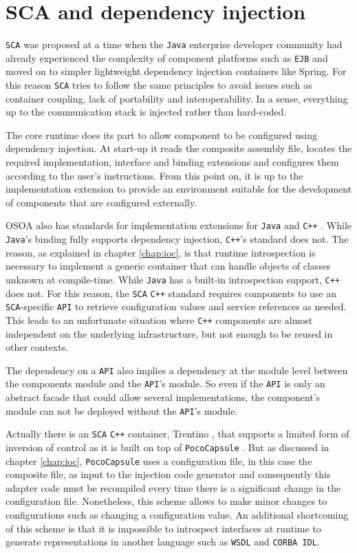\section{SCA and dependency injection}

\texttt{SCA} was proposed at a time when the \texttt{Java} enterprise developer community had already experienced the complexity of component
platforms such as \texttt{EJB} and moved on to simpler lightweight dependency injection containers like Spring. For this reason
\texttt{SCA} tries to follow the same principles to avoid issues such as container coupling, lack of portability and interoperability.
In a sense, everything up to the communication stack is injected rather than hard-coded.

The core runtime does its part to allow component to be configured using dependency injection. At start-up it reads the
composite assembly file, locates the required implementation, interface and binding extensions and configures them
according to the user's instructions. From this point on, it is up to the implementation extension to provide an environment
suitable for the development of components that are configured externally.

OSOA also has standards for implementation extensions for \texttt{Java} and \texttt{C++} \cite{SCA}. While \texttt{Java}'s binding fully supports
dependency injection, \texttt{C++}'s standard does not. The reason, as explained in chapter \ref{chap:ioc}, is that runtime
introspection is necessary to implement a generic container that can handle objects of classes unknown at compile-time.
While \texttt{Java} has a built-in introspection support, \texttt{C++} does not. For this reason, the \texttt{SCA} \texttt{C++} standard requires components
to use an \texttt{SCA}-specific \texttt{API} to retrieve configuration values and service references as needed. This leads to an unfortunate
situation where \texttt{C++} components are almost independent on the underlying infrastructure, but not enough to be reused in
other contexts.

The dependency on a \texttt{API} also implies a dependency at the module level between the components module and the \texttt{API}'s module.
So even if the \texttt{API} is only an abstract facade that could allow several implementations, the component's module can not be deployed
without the \texttt{API}'s module.

Actually there is an \texttt{SCA} \texttt{C++} container, Trentino \cite{Trentino}, that supports a limited form of inversion of control as it is
built on top of \texttt{PocoCapsule} \cite{PocoCapsule}. But as discussed in chapter \ref{chap:ioc}, \texttt{PocoCapsule} uses a configuration
file, in this case the composite file, as input to the injection code generator and consequently this adapter code must be
recompiled every time there is a significant change in the configuration file. Nonetheless, this scheme allows to make minor
changes to configurations such as changing a configuration value. An additional shortcoming of this scheme is that
it is impossible to introspect interfaces at runtime to generate representations in another language such as \texttt{WSDL} and \texttt{CORBA IDL}.

